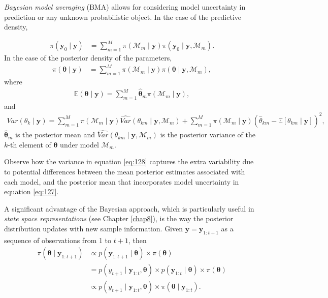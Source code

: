 \textit{Bayesian model averaging} (BMA) allows for considering model uncertainty in prediction or any unknown probabilistic object. In the case of the predictive density, 

\begin{align}
	\pi(\mathbf{y}_0\mid \mathbf{y})&=\sum_{m=1}^M \pi(\mathcal{M}_m\mid \mathbf{y})\pi(\mathbf{y}_0\mid \mathbf{y},\mathcal{M}_m).
\end{align}
In the case of the posterior density of the parameters,
\begin{align}
	\pi(\bm{\theta}\mid \mathbf{y})&=\sum_{m=1}^M \pi(\mathcal{M}_m\mid \mathbf{y})\pi(\bm{\theta}\mid \mathbf{y},\mathcal{M}_m),
\end{align}
where 
\begin{align}
	\mathbb{E}(\bm{\theta}\mid \mathbf{y})=\sum_{m=1}^{M}\hat{\bm{\theta}}_m \pi(\mathcal{M}_m\mid \mathbf{y}),
	\label{eq:127}
\end{align}
and
\begin{align}
	Var({\theta}_k\mid \mathbf{y})= \sum_{m=1}^{M}\pi(\mathcal{M}_m\mid \mathbf{y}) \widehat{Var} ({\theta}_{km}\mid \mathbf{y},\mathcal{M}_m)+\sum_{m=1}^{M} \pi(\mathcal{M}_m\mid \mathbf{y}) (\hat{{\theta}}_{km}-\mathbb{E}[{\theta}_{km}\mid \mathbf{y}])^2,
	\label{eq:128}
\end{align}
$\hat{\bm{\theta}}_m$ is the posterior mean and $\widehat{Var}({\theta}_{km}\mid \mathbf{y},\mathcal{M}_m)$ is the posterior variance of the $k$-th element of $\bm{\theta}$ under model $\mathcal{M}_m$.

Observe how the variance in equation \ref{eq:128} captures the extra variability due to potential differences between the mean posterior estimates associated with each model, and the posterior mean that incorporates model uncertainty in equation \ref{eq:127}.

A significant advantage of the Bayesian approach, which is particularly useful in \textit{state space representations} (see Chapter \ref{chap8}), is the way the posterior distribution updates with new sample information. Given $\mathbf{y} = \mathbf{y}_{1:t+1}$ as a sequence of observations from 1 to $t+1$, then
\begin{align}\label{equpdate}
	\pi(\bm{\theta}\mid \mathbf{y}_{1:t+1})&\propto p(\mathbf{y}_{1:t+1}\mid \bm{\theta})\times \pi(\bm{\theta})\nonumber\\
	&= p(y_{t+1}\mid \mathbf{y}_{1:t},\bm{\theta})\times p(\mathbf{y}_{1:t}\mid \bm{\theta})\times \pi(\bm{\theta})\nonumber\\
	&\propto p(y_{t+1}\mid \mathbf{y}_{1:t},\bm{\theta})\times \pi(\bm{\theta}\mid \mathbf{y}_{1:t}). 
\end{align}

